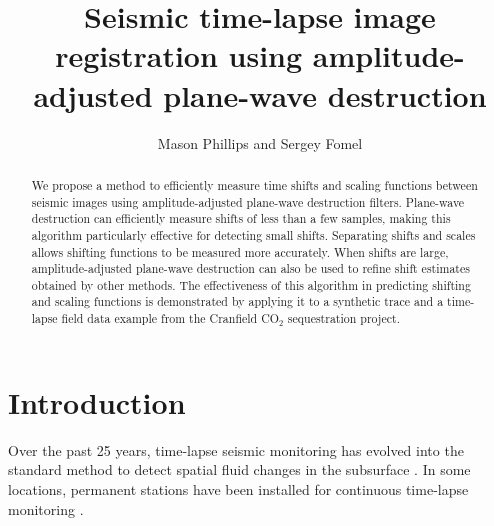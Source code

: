 
\title{Seismic time-lapse image registration using amplitude-adjusted plane-wave destruction}
\author{Mason Phillips and Sergey Fomel}


\maketitle
\begin{abstract}
We propose a method to efficiently measure time shifts and scaling functions 
between seismic images using amplitude-adjusted plane-wave destruction filters. 
Plane-wave destruction can efficiently measure shifts of less than a few 
samples, making this algorithm particularly effective for detecting small 
shifts. Separating shifts and scales allows shifting functions to be measured 
more accurately. When shifts are large, amplitude-adjusted plane-wave 
destruction can also be used to refine shift estimates obtained by other 
methods. The effectiveness of this algorithm in predicting shifting and 
scaling functions is demonstrated by applying it to a synthetic trace and a 
time-lapse field data example from the Cranfield CO$_2$ sequestration project.
\end{abstract}

\section{Introduction}
Over the past 25 years, time-lapse seismic monitoring has evolved into the 
standard method to detect spatial fluid changes in the subsurface 
\cite[]{lumley}. In some locations, permanent stations have been installed for continuous time-lapse 
monitoring \cite[]{berron}.


